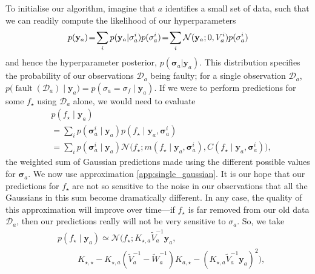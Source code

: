 \documentclass[twoside]{article}
\newcommand{\deq}{=}
\newcommand{\given}{\!\ensuremath{\mid}\!}
\newcommand{\cm}[1]{\ensuremath{\mathcal{#1}}}
\newcommand{\bm}[1]{\ensuremath{\mathbf{#1}}}
\newcommand{\data}{\ensuremath{\cm{D}}}
\newcommand{\vect}[1]{\bm{#1}}
\newcommand{\vy}{\vect{y}}
\newcommand{\vs}{\vect{\sigma}}
\newcommand{\amean}[2]{\tilde{{m}}(#1 \given #2 )}
\newcommand{\p}[2]{p(#1\given#2)}
\newcommand{\fPr}{p}
\newcommand{\Prob}[2]{\fPr(#1 \given #2 )}
\newcommand{\ps}[2]{p(#1\vert#2)}
\newcommand{\mean}[2]{{m}(#1\given#2)}
\newcommand{\cov}[2]{{C}(#1\given#2)}
\newcommand{\N}[3]{\cm{N}( #1;#2,#3 )}
\newcommand{\st}{_{\star}}
\DeclareMathOperator{\fault}{fault}
\begin{document}
To initialise our algorithm, imagine that $a$ identifies a small set
of data, such that we can readily compute the likelihood of our hyperparameters
\begin{equation}
 \hspace{-0.0cm}p(\vy_a)\!=\!\sum_i  \ps{\vy_a}{\vs^i_a}\fPr(\vs^i_a)
\!=\! \sum_i \N{\vy_a}{0}{V_a^i}\fPr(\vs_a^i) \label{eq:likelihood_a}
\end{equation}
and hence the hyperparameter posterior, $\ps{\vs_a}{\vy_{a}}$.
This distribution specifies the probability of our observations
$\data_a$ being faulty; for a single observation $\data_a$,
$
p\bigl(\fault(\data_a) \given \vy_{a}\bigr) = \Prob{\sigma_a = \sigma_f}{\vy_{a}}
$.
If we were to perform predictions for some $f\st$ using $\data_a$
alone, we would need to evaluate
\begin{align*}
& \p{f\st}{\vy_{a}} \\
& = \sum_{i} \Prob{\vs^i_{a}}{\vy_a} \p{f\st}{\vy_a, \vs^{i}_{a}} \\
& =\sum_{i} \Prob{\vs^i_{a}}{\vy_a} \cm{N}\bigl(f\st; \mean{f\st}{\vy_a, \vs^{i}_{a}}, \cov{f\st}{\vy_a, \vs^{i}_{a}}\bigr),
\end{align*}
the weighted sum of Gaussian predictions made using the different
possible values for $\vs_{a}$.  We now use approximation \ref{app:single_gaussian}. It is our hope that our predictions
for $f\st$ are not so sensitive to the noise in our observations that
all the Gaussians in this sum become dramatically different. In any
case, the quality of this approximation will improve over time---if
$f\st$ is far removed from our old data $\data_a$, then our
predictions really will not be very sensitive to $\sigma_a$. So, we take
\begin{align*}
& \p{f\st}{\vy_{a}} \simeq
\cm{N}\bigl(f\st; K_{\star,a} \tilde{V}_a^{-1} \vy_a, 
\\ & \hspace{1cm}
K_{\star,\star} - K_{\star,a}(\tilde{V}_a^{-1}-\tilde{W}_a^{-1})K_{a,\star} 
 - (K_{\star,a} \tilde{V}_a^{-1}\vy_a)^2\bigr),%
\end{align*}
\end{document}
